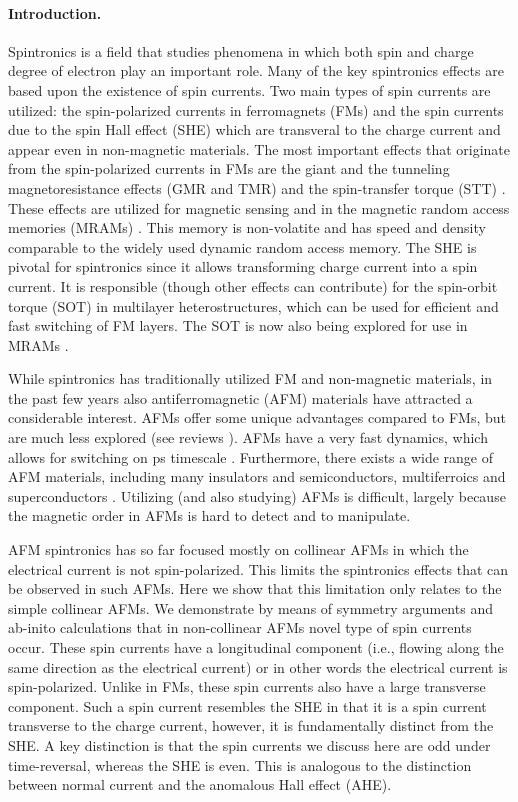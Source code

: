 \documentclass[aps,prl,reprint,amsmath,amssymb,superscriptaddress]{revtex4-1}
\begin{document}
\paragraph{Introduction.}
Spintronics is a field that studies phenomena in which both spin and charge degree of electron play an important role. Many of the key spintronics effects are based upon the existence of spin currents. Two main types of spin currents are utilized: the spin-polarized currents in ferromagnets (FMs) and the spin currents due to the spin Hall effect (SHE) which are transveral to the charge current and appear even in non-magnetic materials. The most important effects that originate from the spin-polarized currents in FMs are the giant and the tunneling magnetoresistance effects (GMR and TMR) \cite{JULLIERE1975225,Miyazaki1995,Moodera1995} and the spin-transfer torque (STT) \cite{Slonczewski1989,Ralph2008}. These effects are utilized for magnetic sensing and in the magnetic random access memories (MRAMs) \cite{Khvalkovskiy2013}. This memory is non-volatite and has speed and density comparable to the widely used dynamic random access memory. The SHE is pivotal for spintronics since it allows transforming charge current into a spin current. It is responsible (though other effects can contribute) for the spin-orbit torque (SOT) \cite{Miron2011,Liu2012} in multilayer heterostructures, which can be used for efficient and fast switching of FM layers. The SOT is now also being explored for use in MRAMs \cite{Prenat2016,Oboril2015}.

While spintronics has traditionally utilized FM and non-magnetic materials, in the past few years also antiferromagnetic (AFM) materials have attracted a considerable interest. AFMs offer some unique advantages compared to FMs, but are much less explored (see reviews \cite{Macdonald2011,Jungwirth2015,Baltz2016}). AFMs have a very fast dynamics, which allows for switching on ps timescale \cite{Gomonay2016,Roy2016,Kimel2004}. Furthermore, there exists a wide range of AFM materials, including many insulators and semiconductors, multiferroics \cite{Eerenstein2006} and superconductors \cite{Lu2015}. Utilizing (and also studying) AFMs is difficult, largely because the magnetic order in AFMs is hard to detect and to manipulate.

AFM spintronics has so far focused mostly on collinear AFMs in which the electrical current is not spin-polarized. This limits the spintronics effects that can be observed in such AFMs. Here we show that this limitation only relates to the simple collinear AFMs. We demonstrate by means of symmetry arguments and ab-inito calculations that in non-collinear AFMs novel type of spin currents occur. These spin currents have a longitudinal component (i.e., flowing along the same direction as the electrical current) or in other words the electrical current is spin-polarized. Unlike in FMs, these spin currents also have a large transverse component. Such a spin current resembles the SHE in that it is a spin current transverse to the charge current, however, it is fundamentally distinct from the SHE. A key distinction is that the spin currents we discuss here are odd under time-reversal, whereas the SHE is even. This is analogous to the distinction between normal current and the anomalous Hall effect (AHE). 
\end{document}
